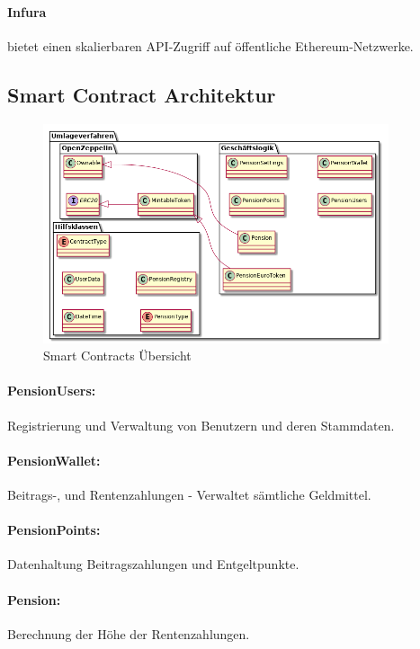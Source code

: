 \paragraph*{Infura} bietet einen skalierbaren API-Zugriff auf öffentliche Ethereum-Netzwerke.


\subsection{Smart Contract Architektur}

\begin{figure}[H]
    \centering
    \includegraphics[width=4.0in]{images/classdiagram-smartcontracts.png}
    \caption{Smart Contracts Übersicht}
    \label{fig:asure_architecture}
\end{figure}


\paragraph*{PensionUsers:} Registrierung und Verwaltung von Benutzern und deren Stammdaten.

\paragraph*{PensionWallet:} Beitrags-, und Rentenzahlungen - Verwaltet sämtliche Geldmittel.


\paragraph*{PensionPoints:} Datenhaltung Beitragszahlungen und Entgeltpunkte.

\paragraph*{Pension:} Berechnung der Höhe der Rentenzahlungen.

